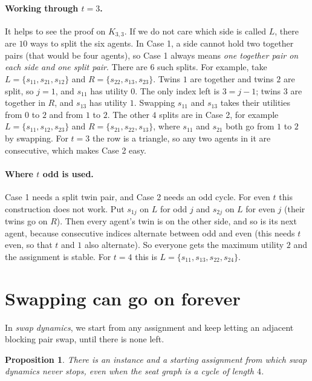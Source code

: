 \documentclass[11pt,a4paper]{article}
\newtheorem{proposition}{Proposition}
\theoremstyle{definition}
\theoremstyle{remark}
\theoremstyle{plain}
\begin{document}
\paragraph{Working through $t=3$.} It helps to see the proof on $K_{3,3}$. If we do not care which side is called $L$, there are $10$ ways to split the six agents. In Case 1, a side cannot hold two together pairs (that would be four agents), so Case 1 always means \emph{one together pair on each side and one split pair}. There are $6$ such splits. For example, take $L=\{s_{11},s_{21},s_{12}\}$ and $R=\{s_{22},s_{13},s_{23}\}$. Twins $1$ are together and twins $2$ are split, so $j=1$, and $s_{11}$ has utility $0$. The only index left is $3=j-1$; twins $3$ are together in $R$, and $s_{13}$ has utility $1$. Swapping $s_{11}$ and $s_{13}$ takes their utilities from $0$ to $2$ and from $1$ to $2$. The other $4$ splits are in Case 2, for example $L=\{s_{11},s_{12},s_{23}\}$ and $R=\{s_{21},s_{22},s_{13}\}$, where $s_{11}$ and $s_{21}$ both go from $1$ to $2$ by swapping. For $t=3$ the row is a triangle, so any two agents in it are consecutive, which makes Case 2 easy.

\paragraph{Where $t$ odd is used.} Case 1 needs a split twin pair, and Case 2 needs an odd cycle. For even $t$ this construction does not work. Put $s_{1j}$ on $L$ for odd $j$ and $s_{2j}$ on $L$ for even $j$ (their twins go on $R$). Then every agent's twin is on the other side, and so is its next agent, because consecutive indices alternate between odd and even (this needs $t$ even, so that $t$ and $1$ also alternate). So everyone gets the maximum utility $2$ and the assignment is stable. For $t=4$ this is $L=\{s_{11},s_{13},s_{22},s_{24}\}$.

\section{Swapping can go on forever}

In \emph{swap dynamics}, we start from any assignment and keep letting an adjacent blocking pair swap, until there is none left.

\begin{proposition}\label{prop:loop}
There is an instance and a starting assignment from which swap dynamics never stops, even when the seat graph is a cycle of length $4$.
\end{proposition}
\end{document}

